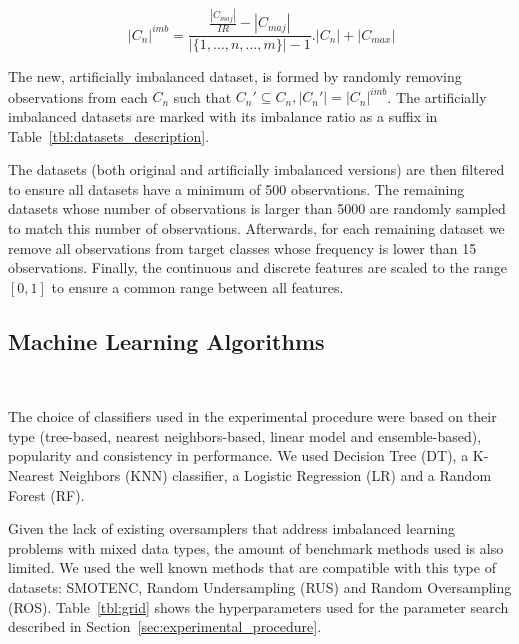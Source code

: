\documentclass[parskip=full]{scrartcl}
\begin{document}
\begin{equation}~\label{eq:sampling}
    |C_n|^{imb} =
    \frac{\frac{|C_{maj}|}{IR}-|C_{maj}|}{|\{1,\ldots,n,\ldots,m\}|-1}.|C_n|+|C_{max}|
\end{equation}

The new, artificially imbalanced dataset, is formed by randomly removing
observations from each $C_n$ such that $C_n' \subseteq C_n , |C_n'| =
|C_n|^{imb}$. The artificially imbalanced datasets are marked with its
imbalance ratio as a suffix in Table~\ref{tbl:datasets_description}.

The datasets (both original and artificially imbalanced versions) are then
filtered to ensure all datasets have a minimum of 500 observations.  The
remaining datasets whose number of observations is larger than 5000 are
randomly sampled to match this number of observations. Afterwards, for each
remaining dataset we remove all observations from target classes whose
frequency is lower than 15 observations. Finally, the continuous and discrete
features are scaled to the range $[0,1]$ to ensure a common range between all
features. 

\subsection{Machine Learning Algorithms}~\label{sec:ml_algorithms}

The choice of classifiers used in the experimental procedure were based on
their type (tree-based, nearest neighbors-based, linear model and
ensemble-based), popularity and consistency in performance. We used Decision
Tree (DT), a K-Nearest Neighbors (KNN) classifier, a Logistic
Regression (LR) and a Random Forest (RF).

Given the lack of existing oversamplers that address imbalanced learning
problems with mixed data types, the amount of benchmark methods used is also
limited. We used the well known methods that are compatible with this type of
datasets: SMOTENC, Random Undersampling (RUS) and Random Oversampling (ROS).
Table~\ref{tbl:grid} shows the hyperparameters used for the parameter search
described in Section~\ref{sec:experimental_procedure}.
\end{document}
